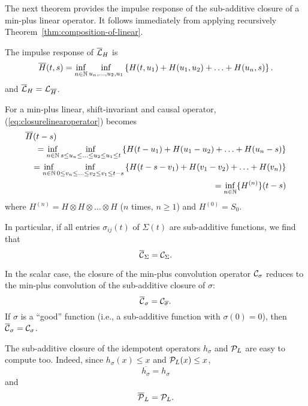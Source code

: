 The next theorem provides the impulse response of the sub-additive
closure of a min-plus linear operator. It follows immediately from
applying recursively Theorem~\ref{thm:composition-of-linear}.


\begin{theorem}
The impulse response of $\overline{\mathcal L}_{H}$ is
\begin{equation}
\label{eq:closurelinearoperator}
\overline{H}(t,s) = \inf_{n \in \mathbb{N}} \inf_{u_n, \ldots , u_2, u_1} \left\{ H(t,u_1) + H(u_1,u_2) + \ldots + H(u_n,s) \right\}.
\end{equation}
and $\overline{\mathcal L}_{H} =\mathcal L_{\overline{H}}$.
\end{theorem}

For a min-plus linear, shift-invariant and causal operator, (\ref{eq:closurelinearoperator}) becomes
\begin{eqnarray}
\label{eq:closureltioperator}
 \lefteqn{\overline{H}(t-s) \nonumber} \\
  & & = \inf_{n \in \Nats} \inf_{s \leq u_n  \leq \ldots \leq u_2 \leq
u_1 \leq t} \left\{ H(t-u_1) + H(u_1-u_2) + \ldots + H(u_n-s)
\right\} \nonumber \\
 & & = \inf_{n \in \Nats} \inf_{0 \leq v_n
\leq \ldots \leq v_2 \leq v_1 \leq t-s} \left\{ H(t-s-v_1) +
H(v_1-v_2) + \ldots + H(v_n) \right\} \nonumber \\
 &  & = \inf_{n
\in \Nats} \{ H^{(n)} \}(t-s)
\end{eqnarray}
where $H^{(n)} = H \otimes H \otimes \ldots \otimes H$ ($n$ times, $n \geq 1$) and  $H^{(0)} = S_0$.

In particular, if all entries $\sigma_{ij}(t)$ of $\Sigma(t)$ are sub-additive functions, we find that
$$ \overline{\mathcal C}_\Sigma = \mathcal C_\Sigma . $$

In the scalar case, the closure of the min-plus convolution operator $\mathcal C_\sigma$ reduces to the min-plus convolution of the sub-additive closure of $\sigma$:
$$ \overline{\mathcal C}_\sigma = \mathcal C_{\overline{\sigma}}. $$
If $\sigma$ is a ``good'' function (i.e., a sub-additive function with $\sigma(0) = 0$), then $ \overline{\mathcal C}_\sigma = \mathcal C_{\sigma}$.

The sub-additive closure of the idempotent operators $h_{\sigma}$ and $\mathcal P_L$ are easy to compute too.
Indeed, since $h_{\sigma}(x) \leq x$ and $\mathcal P_{L}(x) \leq x$,
$$ \overline{h_{\sigma}} = h_{\sigma} $$
and
$$ \overline{\mathcal P}_{L} = \mathcal P_{L}. $$

